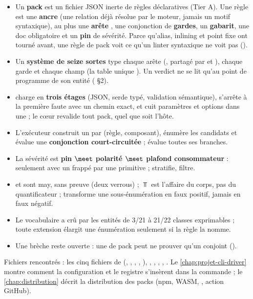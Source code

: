 \begin{resume}
\begin{itemize}
  \item Un \textbf{pack} est un fichier JSON inerte de règles déclaratives (Tier A). Une règle est une \textbf{ancre} (une relation déjà résolue par le moteur, jamais un motif syntaxique), au plus une \textbf{arête} , une conjonction de \textbf{gardes}, un \textbf{gabarit}, une doc obligatoire et un \textbf{pin} de sévérité. Parce qu'alias, inlining et point fixe ont tourné avant, une règle de pack voit ce qu'un linter syntaxique ne voit pas ().
  \item Un \textbf{système de seize sortes} type chaque arête (, partagé par  et ), chaque garde et chaque champ (la table unique ). Un verdict ne se lit qu'au point de programme de son entité ( §2).
  \item {} charge en \textbf{trois étages} (JSON, serde typé, validation sémantique), s'arrête à la première faute avec un chemin exact, et cuit paramètres et options dans une  ; le cœur revalide tout pack, quel que soit l'hôte.
  \item L'exécuteur  construit un  par (règle, composant), énumère les candidats et évalue une \textbf{conjonction court-circuitée} ;  évalue toutes ses branches.
  \item La sévérité est \textbf{pin $\meet$ polarité $\meet$ plafond consommateur} : \Error{} seulement avec un  frappé par une primitive  ;  stratifie,  filtre.
  \item {} et  sont may, sans preuve (deux verrous) ; $\Top$ est l'affaire du corps, pas du quantificateur ;  transforme une sous-énumération en faux positif, jamais en faux négatif.
  \item Le vocabulaire a crû par les entités de 3/21 à 21/22 classes exprimables ; toute extension élargit une énumération seulement si la règle la nomme.
  \item Une brèche reste ouverte : une \Error{} de pack peut ne prouver qu'un conjoint ().
\end{itemize}
Fichiers rencontrés : les cinq fichiers de  (, , , , ), , , , , . Le \cref{chap:projet-cli-driver} montre comment la configuration et le registre s'insèrent dans la commande  ; le \cref{chap:distribution} décrit la distribution des packs (npm, WASM, , action GitHub).
\end{resume}

